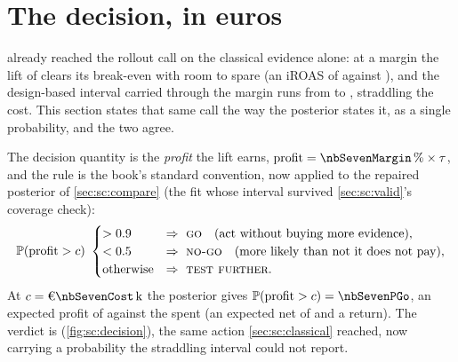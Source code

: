 \section{The decision, in euros}
\label{sec:sc:euro}

 already reached the rollout call on the classical evidence alone: at a
\pc{\nbSevenMargin} margin the lift of \keur{\nbSevenClTotal} clears its \keur{\nbSevenBreakevenLift}
break-even with room to spare (an iROAS of \nbSevenIroas{} against \nbSevenBreakevenIroas{}), and the
design-based interval carried through the margin runs from \keur{\nbSevenClProfitLo} to
\keur{\nbSevenClProfitHi}, straddling the \keur{\nbSevenCost} cost. This section states that same call
the way the posterior states it, as a single probability, and the two agree.

The decision quantity is the \emph{profit} the lift earns, $\text{profit} = \pc{\nbSevenMargin} \times \tau$,
and the rule is the book's standard convention, now applied to the repaired posterior of
\cref{sec:sc:compare} (the fit whose interval survived \cref{sec:sc:valid}'s coverage check):
%
\begin{equation}
  \operatorname{\mathbb{P}}(\text{profit} > c)\ \begin{cases}
    > 0.9 & \Rightarrow\ \textsc{go} \quad\text{(act without buying more evidence)},\\
    < 0.5 & \Rightarrow\ \textsc{no-go} \quad\text{(more likely than not it does not pay)},\\
    \text{otherwise} & \Rightarrow\ \textsc{test further}.
  \end{cases}
  \label{eq:sc:rule}
\end{equation}
%
At $c = \keur{\nbSevenCost}$ the posterior gives $\Prob(\text{profit} > c) = \nbSevenPGo$, an expected
profit of \keur{\nbSevenExpProfit} against the \keur{\nbSevenCost} spent (an expected net of
\keur{\nbSevenExpNet} and a \pc{\nbSevenExpRoi} return). The verdict is \textbf{\nbSevenDecision}
(\cref{fig:sc:decision}), the same action \cref{sec:sc:classical} reached, now carrying a probability
the straddling interval could not report.



